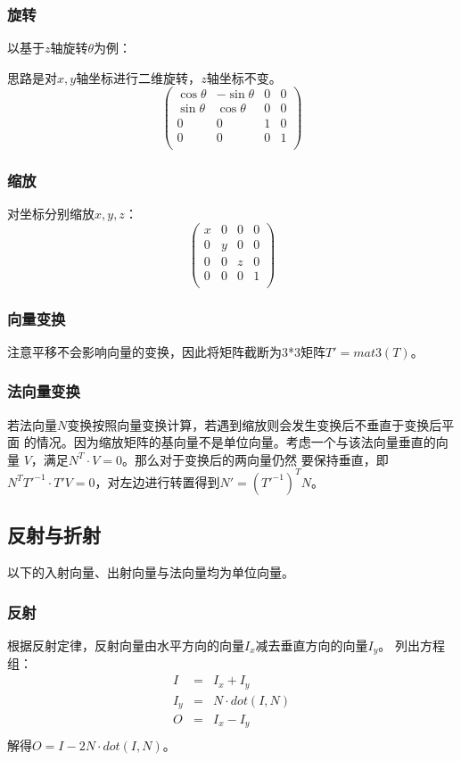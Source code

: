 \subsubsection{旋转}
以基于$z$轴旋转$\theta$为例：

思路是对$x,y$轴坐标进行二维旋转，$z$轴坐标不变。
\begin{displaymath}
	\left(\begin{array}{cccc}
		\cos \theta & -\sin \theta & 0 & 0 \\
		\sin \theta & \cos \theta  & 0 & 0 \\
		0           & 0            & 1 & 0 \\
		0           & 0            & 0 & 1 \\
	\end{array}\right)
\end{displaymath}
\subsubsection{缩放}
对坐标分别缩放$x,y,z$：
\begin{displaymath}
    \left(\begin{array}{cccc}
        x & 0 & 0 & 0 \\
        0 & y & 0 & 0 \\
        0 & 0 & z & 0 \\
        0 & 0 & 0 & 1 \\
    \end{array}\right)
\end{displaymath}
\subsubsection{向量变换}
注意平移不会影响向量的变换，因此将矩阵截断为3*3矩阵$T'=mat3(T)$。
\subsubsection{法向量变换}
若法向量$N$变换按照向量变换计算，若遇到缩放则会发生变换后不垂直于变换后平面
的情况。因为缩放矩阵的基向量不是单位向量。考虑一个与该法向量垂直的向量
$V$，满足$N^T\cdot V=0$。那么对于变换后的两向量仍然
要保持垂直，即$N^TT'^{-1} \cdot T'V=0$，对左边进行转置得到$N'=(T'^{-1})^TN$。
\subsection{反射与折射}
以下的入射向量、出射向量与法向量均为单位向量。
\subsubsection{反射}
根据反射定律，反射向量由水平方向的向量$I_x$减去垂直方向的向量$I_y$。
列出方程组：
\begin{eqnarray*}
    I&=&I_x+I_y\\
    I_y&=&N\cdot dot(I,N)\\
    O&=&I_x-I_y\\
\end{eqnarray*}
解得$O=I-2N\cdot dot(I,N)$。
